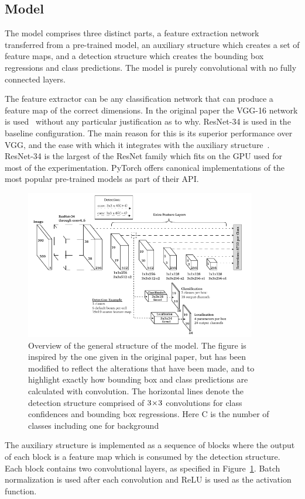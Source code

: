 \subsection{Model}
The model comprises three distinct parts, a feature extraction network transferred from a pre-trained model, an auxiliary structure which creates a set of feature maps, and a detection structure which creates the bounding box regressions and class predictions.
The model is purely convolutional with no fully connected layers.

The feature extractor can be any classification network that can produce a feature map of the correct dimensions.
In the original paper the VGG-16 network is used\ \parencite{simonyan2015deep} without any particular justification as to why.
ResNet-34 is used in the baseline configuration.
The main reason for this is its superior performance over VGG, and the ease with which it integrates with the auxiliary structure\ \parencite{he2015deep}.
ResNet-34 is the largest of the ResNet family which fits on the GPU used for most of the experimentation.
PyTorch offers canonical implementations of the most popular pre-trained models as part of their API\@.

\begin{figure}[htb]
  \centering
  \includegraphics[width=0.9\textwidth]{figs/method/model.pdf}
  \caption[Model architecture overview]{Overview of the general structure of the model.
The figure is inspired by the one given in the original paper, but has been modified to reflect the alterations that have been made, and to highlight exactly how bounding box and class predictions are calculated with convolution.
The horizontal lines denote the detection structure comprised of \(3\!\times \! 3\) convolutions for class confidences and bounding box regressions.
Here \textsf{C} is the number of classes including one for background}\label{fig:model}
\end{figure}
The auxiliary structure is implemented as a sequence of blocks where the output of each block is a feature map which is consumed by the detection structure.
Each block contains two convolutional layers, as specified in Figure~\ref{fig:model}.
Batch normalization is used after each convolution and ReLU is used as the activation function.

